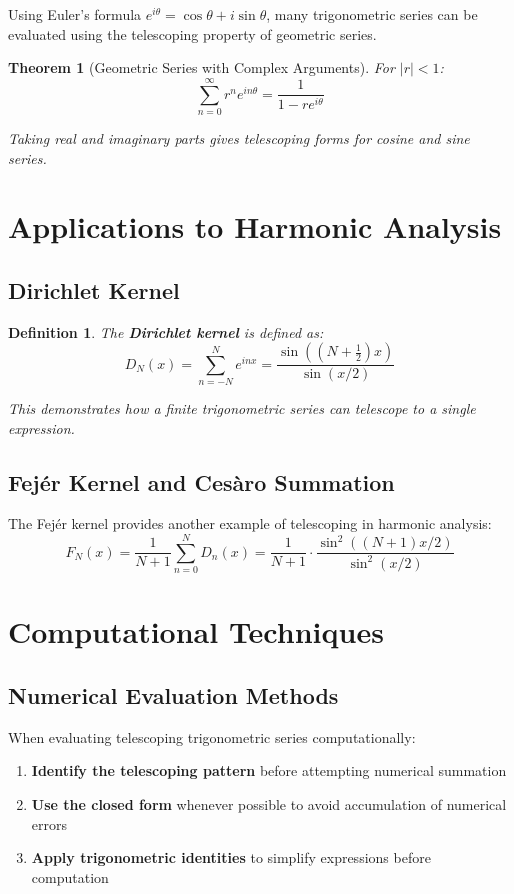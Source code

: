\documentclass[12pt]{article}
\newtheorem{definition}{Definition}
\newtheorem{theorem}{Theorem}
\begin{document}
Using Euler's formula $e^{i\theta} = \cos\theta + i\sin\theta$, many trigonometric series can be evaluated using the telescoping property of geometric series.

\begin{theorem}[Geometric Series with Complex Arguments]
For $|r| < 1$:
$$\sum_{n=0}^{\infty} r^n e^{in\theta} = \frac{1}{1-re^{i\theta}}$$

Taking real and imaginary parts gives telescoping forms for cosine and sine series.
\end{theorem}

\section{Applications to Harmonic Analysis}

\subsection{Dirichlet Kernel}

\begin{definition}
The \textbf{Dirichlet kernel} is defined as:
$$D_N(x) = \sum_{n=-N}^{N} e^{inx} = \frac{\sin((N+\frac{1}{2})x)}{\sin(x/2)}$$

This demonstrates how a finite trigonometric series can telescope to a single expression.
\end{definition}

\subsection{Fejér Kernel and Cesàro Summation}

The Fejér kernel provides another example of telescoping in harmonic analysis:
$$F_N(x) = \frac{1}{N+1}\sum_{n=0}^{N} D_n(x) = \frac{1}{N+1} \cdot \frac{\sin^2((N+1)x/2)}{\sin^2(x/2)}$$

\section{Computational Techniques}

\subsection{Numerical Evaluation Methods}

When evaluating telescoping trigonometric series computationally:

\begin{enumerate}
\item \textbf{Identify the telescoping pattern} before attempting numerical summation
\item \textbf{Use the closed form} whenever possible to avoid accumulation of numerical errors
\item \textbf{Apply trigonometric identities} to simplify expressions before computation
\end{enumerate}
\end{document}
